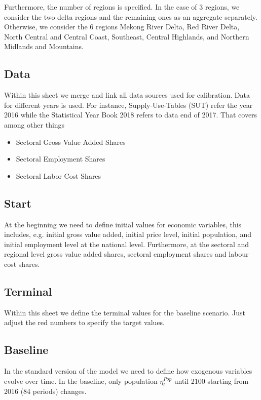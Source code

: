 \documentclass[10pt,a4paper]{article}
\begin{document}
Furthermore, the number of regions is specified. In the case of 3 regions, we consider the two delta regions and the remaining ones as an aggregate separately. Otherwise, we consider the 6 regions Mekong River Delta, Red River Delta, North Central and Central Coast, Southeast, Central Highlands, and Northern Midlands and Mountains.


 
\subsection{Data}

Within this sheet we merge and link all data sources used for calibration. Data for different years is used. For instance, Supply-Use-Tables (SUT) refer the year 2016 while the Statistical Year Book 2018 refers to data end of 2017.
That covers among other things 
\begin{itemize}
	\item Sectoral Gross Value Added Shares
	\item Sectoral Employment Shares
	\item Sectoral Labor Cost Shares
\end{itemize}



\subsection{Start}
At the beginning we need to define initial values for economic variables, this includes, e.g. initial gross value added, initial price level, initial population, and initial employment level at the national level. Furthermore, at the sectoral and regional level gross value added shares, sectoral employment shares and labour cost shares.

\subsection{Terminal}
 Within this sheet we define the terminal values for the baseline scenario. Just adjust the red numbers to specify the target values.
 
 \subsection{Baseline} 
 In the standard version of the model we need to define how exogenous variables evolve over time. In the baseline, only population $\eta^{Pop}_{t}$ until 2100 starting from 2016 (84 periods) changes.
 
\end{document}
